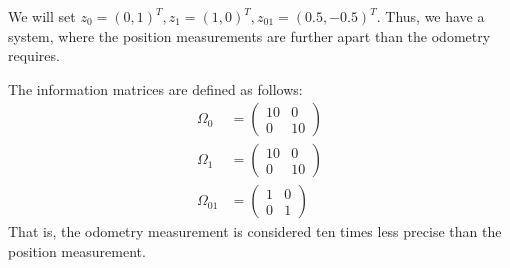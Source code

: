 We will set $z_{0}=(0,1)^T, z_1 = (1,0)^T, z_{01} = (0.5, -0.5)^T$.
Thus, we have a system, where the position measurements are further apart
than the odometry requires.

The information matrices are defined as follows:
\begin{align}
    \Omega_{0} &= \begin{pmatrix}
                      10 & 0 \\ 0 & 10
    \end{pmatrix}\\
    \Omega_{1} &= \begin{pmatrix}
                      10 & 0 \\ 0 & 10
    \end{pmatrix}\\
    \Omega_{01} &=\begin{pmatrix}
                      1 & 0 \\ 0 & 1
    \end{pmatrix}
\end{align}
That is, the odometry measurement is considered ten times less precise than the position measurement.

